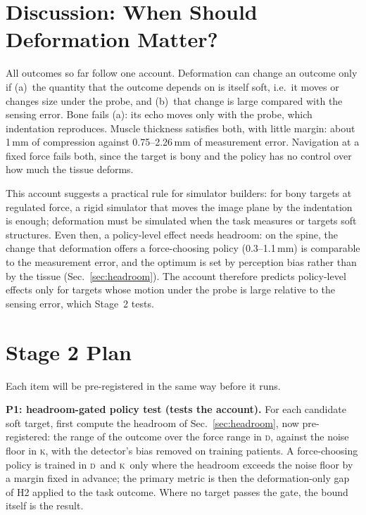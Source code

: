 \documentclass[conference]{IEEEtran}
\newcommand{\KM}{\textsc{k}}   %
\newcommand{\DM}{\textsc{d}}   %
\begin{document}
\section{Discussion: When Should Deformation Matter?}

All outcomes so far follow one account. Deformation can change an outcome only if (a)~the quantity that the outcome
depends on is itself soft, i.e.\ it moves or changes size under the probe, and (b)~that change is large compared with
the sensing error. Bone fails (a): its echo moves only with the probe, which indentation reproduces. Muscle
thickness satisfies both, with little margin: about 1\,mm of compression against 0.75--2.26\,mm of measurement
error. Navigation at a fixed force fails both, since the target is bony and the policy has no control over how much
the tissue deforms.

This account suggests a practical rule for simulator builders: for bony targets at regulated force, a rigid
simulator that moves the image plane by the indentation is enough; deformation must be simulated when the task
measures or targets soft structures. Even then, a policy-level effect needs headroom: on the spine, the change that
deformation offers a force-choosing policy (0.3--1.1\,mm) is comparable to the measurement error, and the optimum is
set by perception bias rather than by the tissue (Sec.~\ref{sec:headroom}). The account therefore predicts policy-level
effects only for targets whose motion under the probe is large relative to the sensing error, which Stage~2 tests.

\section{Stage 2 Plan}
\label{sec:plan}

Each item will be pre-registered in the same way before it runs.

\textbf{P1: headroom-gated policy test (tests the account).} For each candidate soft target, first compute the
headroom of Sec.~\ref{sec:headroom}, now pre-registered: the range of the outcome over the force range in \DM, against
the noise floor in \KM, with the detector's bias removed on training patients. A force-choosing policy is trained in
\DM\ and \KM\ only where the headroom exceeds the noise floor by a margin fixed in advance; the primary metric is then
the deformation-only gap of H2 applied to the task outcome. Where no target passes the gate, the bound itself is the
result.
\end{document}
